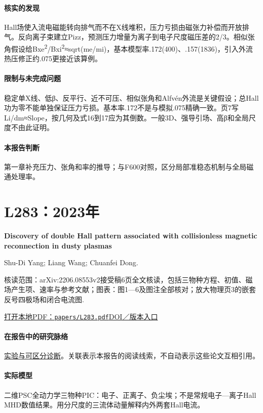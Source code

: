 \paragraph{核实的发现}Hall场使入流电磁能转向排气而不在X线堆积，压力亏损由磁张力补偿而开放排气。反向离子束建立Pizz，预测压力增量为离子到电子尺度磁压差的2/3。相似张角假设给Bxe\textsuperscript{2}/Bxi\textsuperscript{2}≈sqrt(me/mi)，基本模型率.172(400)、.157(1836)，引入外流热压修正约.075更接近该算例。

\paragraph{限制与未完成问题}稳定单X线、低β、反平行、近不可压、相似张角和Alfvén外流是关键假设；总Hall功为零不能单独保证压力亏损。基本率.172不是与模拟.075精确一致。页7写Li/dm≈Slope，按几何及式16到17应为其倒数。一般3D、强导引场、高β和全局尺度不由此证明。

\paragraph{本报告判断}第一章补充压力、张角和率的推导；与F600对照，区分局部准稳态机制与全局磁通处理率。

\section{L283：2023年}\label{paper:L283}

\textbf{Discovery of double Hall pattern associated with collisionless magnetic reconnection in dusty plasmas}\citep{L283}\

Shu-Di Yang;  Liang Wang;  Chuanfei Dong.

\textsf{核读范围：}arXiv:2206.08553v2接受稿6页全文核读，包括三物种方程、初值、磁场产生项、速率与参考文献；\textsf{图表：}图1—6及图注全部核对；放大物理页3的嵌套反号四极场和闭合电流图.

\href{run:papers/L283.pdf}{打开本地PDF：\texttt{papers/L283.pdf}}\quad\href{https://doi.org/10.1093/mnras/stad1453}{DOI／版本入口}

\paragraph{在报告中的研究脉络}\hyperref[story:diagnostic]{实验与可区分诊断}。关联表示本报告的阅读线索，不自动表示这些论文互相引用。

\paragraph{实际模型}二维PSC全动力学三物种PIC：电子、正离子、负尘埃；不是常规电子—离子Hall MHD数值结果。用分尺度的三流体动量解释内外两套Hall电流。

